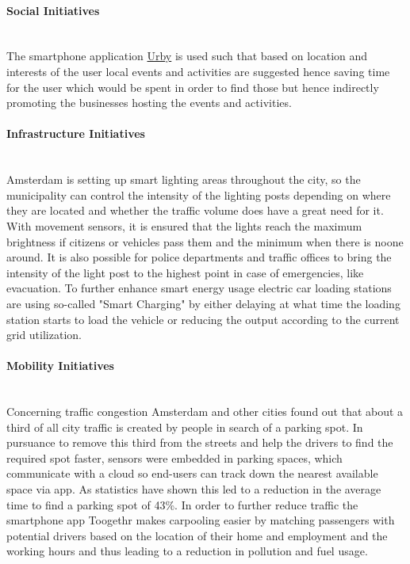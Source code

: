 \documentclass[a4paper,12pt]{report}
\begin{document}
		\paragraph{Social Initiatives} \hfill \\
		The smartphone application \href{http://www.urbyapp.com/}{Urby} is used such that based on location and interests of the user local events and activities are suggested hence saving time for the user which would be spent in order to find those but hence indirectly promoting the businesses hosting the events and activities.
		\paragraph{Infrastructure Initiatives \cite{SmartCityAmsterdamYT}} \hfill \\
		Amsterdam is setting up smart lighting areas throughout the city, so the municipality can control the intensity of the lighting posts depending on where they are located and whether the traffic volume does have a great need for it. With movement sensors, it is ensured that the lights reach the maximum brightness if citizens or vehicles pass them and the minimum when there is noone around. It is also possible for police departments and traffic offices to bring the intensity of the light post to the highest point in case of emergencies, like evacuation. To further enhance smart energy usage electric car loading stations are using so-called "Smart Charging" by either delaying at what time the loading station starts to load the vehicle or reducing the output according to the current grid utilization.
		\paragraph{Mobility Initiatives} \hfill \label{AmsterdamMobilityInitiatives} \\
		Concerning traffic congestion Amsterdam and other cities found out that about a third of all city traffic is created by people in search of a parking spot. In pursuance to remove this third from the streets and help the drivers to find the required spot faster, sensors were embedded in parking spaces, which communicate with a cloud so end-users can track down the nearest available space via app. As statistics have shown this led to a reduction in the average time to find a parking spot of 43\%. In order to further reduce traffic the smartphone app Toogethr makes carpooling easier by matching passengers with potential drivers based on the location of their home and employment and the working hours and thus leading to a reduction in pollution and fuel usage.
\end{document}
